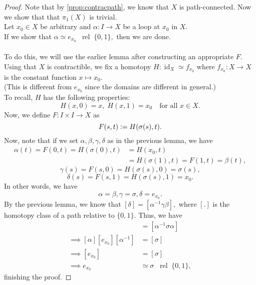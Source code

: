 \documentclass[12pt]{article}
\theoremstyle{definition}
\numberwithin{thm}{section}
\newcommand{\rel}{\;\;\operatorname{rel}\;}
\newcommand{\id}{\operatorname{id}}
\begin{document}
\begin{proof} 
	Note that by \cref{prop:contracpath}, we know that $X$ is path-connected. Now we show that that $\pi_1(X)$ is trivial.\\
	Let $x_0 \in X$ be arbitrary and $\alpha:I\to X$ be a loop at $x_0$ in $X.$\\
	If we show that $\alpha \simeq e_{x_0} \rel \{0, 1\},$ then we are done.\\~\\
	To do this, we will use the earlier lemma after constructing an appropriate $F.$\\
	Using that $X$ is contractible, we fix a homotopy $H:\id_X \simeq f_{x_0}$ where $f_{x_0}:X\to X$ is the constant function $x \mapsto x_0.$\\
	(This is different from $e_{x_0}$ since the domains are different in general.)\\
	To recall, $H$ has the following properties:
	\begin{equation*} 
		H(x, 0) = x,\; H(x, 1) = x_0 \quad \text{for all } x \in X.
	\end{equation*}
	Now, we define $F:I\times I \to X$ as 
	\begin{equation*} 
		F(s, t) \vcentcolon= H(\sigma(s), t).
	\end{equation*}
	Now, note that if we set $\alpha, \beta, \gamma, \delta$ as in the previous lemma, we have
	\begin{align*} 
		\alpha(t) = F(0, t) = H(\sigma(0), t) &= H(x_0, t)\\
		&= H(\sigma(1), t) = F(1, t) = \beta(t),
	\end{align*}
	\begin{equation*} 
		\gamma(s) = F(s, 0) = H(\sigma(s), 0) = \sigma(s),
	\end{equation*}
	\begin{equation*} 
		\delta(s) = F(s, 1) = H(\sigma(s), 1) = x_0.
	\end{equation*}
	In other words, we have
	\begin{equation*} 
		\alpha = \beta, \gamma = \sigma, \delta = e_{x_0}.
	\end{equation*}
	By the previous lemma, we know that $[\delta] = [\alpha^{-1}\gamma\beta],$ where $[.]$ is the homotopy class of a path relative to $\{0, 1\}.$ Thus, we have
	\begin{align*} 
		[e_{x_0}] &= [\alpha^{-1}\sigma\alpha]\\
		\implies [\alpha][e_{x_0}][\alpha^{-1}] &= [\sigma]\\
		\implies [e_{x_0}] &= [\sigma]\\
		\implies e_{x_0} &\simeq \sigma \rel \{0, 1\},
	\end{align*}
	finishing the proof.
\end{proof}
\end{document}

